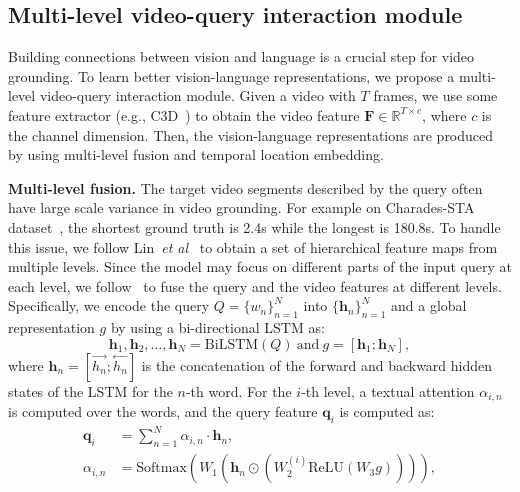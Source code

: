 \documentclass[10pt,twocolumn,letterpaper]{article}
\def\etal{\emph{et al}\onedot}
\def\Vec#1{{\boldsymbol{#1}}}
\begin{document}
		\subsection{Multi-level video-query interaction module}
	\label{sec:feature}
	
	Building connections between vision and language is a crucial step for video grounding. To learn better vision-language representations, we propose a  multi-level video-query interaction module.
	Given a video with $T$ frames, we use some feature extractor (e.g., C3D~\cite{tran2015learning}) to obtain the video feature $\mathbf{F} \in \mathbb{R}^{T \times c}$, where $c$ is the channel dimension.  Then, the vision-language representations are produced by using multi-level fusion and temporal location embedding.
	
	\noindent \textbf{Multi-level fusion.}  The target video segments described by the query often have large scale variance in video grounding. For example on Charades-STA dataset~\cite{gao2017tall}, the shortest ground truth is 2.4s while the longest is 180.8s. To handle this issue, we follow Lin~\etal~\cite{lin2017feature} to obtain a set of hierarchical feature maps from multiple levels.
	Since the model may focus on different parts of the input query at each level, we follow~\cite{hu2018explainable} to fuse the query and the video features at different levels.
	Specifically, we encode the query $Q=\{w_n\}_{n=1}^{N}$ into $\{\Vec{h}_n\}_{n=1}^N$ and a global representation $g$ by using a bi-directional LSTM as:
	\begin{equation}
	\Vec{h}_1,\Vec{h}_2,\dots,\Vec{h}_{N} = \mathrm{BiLSTM}(Q)\ \text{and}\ g=[\Vec{h}_1;\Vec{h}_N],
	\end{equation}
	where $\Vec{h}_n = [\stackrel{\rightarrow}{h_n};\stackrel{\leftarrow}{h_n}]$
	is the concatenation of the forward and backward hidden states of the LSTM for the $n$-th word. For the $i$-th level, a textual attention $\alpha_{i,n}$ is computed over the words, and the query feature $\Vec{q}_i$ is computed as:
	\begin{equation}
	\begin{split}
	\Vec{q}_i & = \sum_{n=1}^{N} \alpha_{i,n} \cdot \Vec{h}_n,\\
	\alpha_{i,n} & = \mathrm{Softmax}(W_1(\Vec{h}_n \odot (W_2^{(i)} \text{ReLU}(W_{3}g)))), 
	\end{split}	
	\end{equation}
\end{document}
